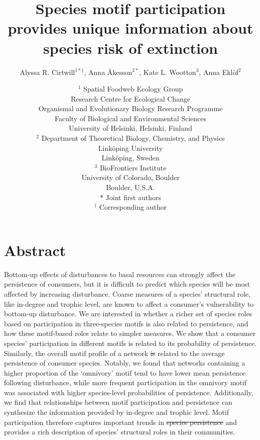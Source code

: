 \documentclass[12pt]{article}
\title{Species motif participation provides unique information about species risk of extinction}
\author{Alyssa R. Cirtwill{$^{1*\dagger}$, Anna \r{A}kesson$^{2*}$,  Kate L. Wootton$^{3}$, Anna Ekl\"{o}f{$^{2}$}}}
\date{\small$^1$ Spatial Foodweb Ecology Group\\
Research Centre for Ecological Change\\
Organismal and Evolutionary Biology Research Programme\\
Faculty of Biological and Environmental Sciences\\
University of Helsinki, Helsinki, Finland\\
\medskip
$^2$ Department of Theoretical Biology, Chemistry, and Physics\\ 
Link\"{o}ping University \\
Link\"{o}ping, Sweden\\
\medskip
\small $^3$ BioFrontiers Institute\\
University of Colorado, Boulder\\
Boulder, U.S.A. \\
\medskip
* Joint first authors\\
\medskip
$^\dagger$ Corresponding author}
\providecommand{\DIFadd}[1]{{\protect\color{blue}\uwave{#1}}} %
\providecommand{\DIFdel}[1]{{\protect\color{red}\sout{#1}}}                      %
\providecommand{\DIFaddbegin}{} %
\providecommand{\DIFaddend}{} %
\providecommand{\DIFdelbegin}{} %
\providecommand{\DIFdelend}{} %
\newcommand{\DIFscaledelfig}{0.5}
\newlength{\DIFdelgraphicswidth} %
\newlength{\DIFdelgraphicsheight} %
\newcommand{\DIFaddincludegraphics}[2][]{{\color{blue}\fbox{\DIFOincludegraphics[#1]{#2}}}} %
\newcommand{\DIFdelincludegraphics}[2][]{%
\sbox{\DIFdelgraphicsbox}{\DIFOincludegraphics[#1]{#2}}%
\settoboxwidth{\DIFdelgraphicswidth}{\DIFdelgraphicsbox} %
\settoboxtotalheight{\DIFdelgraphicsheight}{\DIFdelgraphicsbox} %
\scalebox{\DIFscaledelfig}{%
\parbox[b]{\DIFdelgraphicswidth}{\usebox{\DIFdelgraphicsbox}\\[-\baselineskip] \rule{\DIFdelgraphicswidth}{0em}}\llap{\resizebox{\DIFdelgraphicswidth}{\DIFdelgraphicsheight}{%
\setlength{\unitlength}{\DIFdelgraphicswidth}%
\begin{picture}(1,1)%
\thicklines\linethickness{2pt} %
{\color[rgb]{1,0,0}\put(0,0){\framebox(1,1){}}}%
{\color[rgb]{1,0,0}\put(0,0){\line( 1,1){1}}}%
{\color[rgb]{1,0,0}\put(0,1){\line(1,-1){1}}}%
\end{picture}%
}\hspace*{3pt}}} %
} %
\DeclareRobustCommand{\DIFaddbegin}{\DIFOaddbegin \let\includegraphics\DIFaddincludegraphics} %
\DeclareRobustCommand{\DIFaddend}{\DIFOaddend \let\includegraphics\DIFOincludegraphics} %
\DeclareRobustCommand{\DIFdelbegin}{\DIFOdelbegin \let\includegraphics\DIFdelincludegraphics} %
\DeclareRobustCommand{\DIFdelend}{\DIFOaddend \let\includegraphics\DIFOincludegraphics} %
\begin{document}
 
\maketitle 
\linenumbers
\raggedright

\setlength{\parindent}{15pt} 


\section*{Abstract}


    Bottom-up effects of disturbances to basal resources can strongly affect the persistence of consumers, but it is difficult to predict which species will be most affected by increasing disturbance.
    Coarse measures of a species' structural role, like in-degree and trophic level, are known to affect a consumer's vulnerability to bottom-up disturbance.
    We are interested in whether a richer set of species roles based on participation in three-species motifs is also related to persistence, and how these motif-based roles relate to simpler measures.
    We show that a consumer species' participation in different motifs is related to its probability of persistence. 
    Similarly, the overall motif profile of a network \DIFdelbegin \DIFdel{is }\DIFdelend \DIFaddbegin \DIFadd{was }\DIFaddend related to the average persistence of consumer species.
    Notably, we found that networks containing a higher proportion of the `omnivory' motif tend to have lower mean persistence following disturbance, while more frequent participation in the omnivory motif was associated with higher species-level probabilities of persistence.
    Additionally, we find that relationships between motif participation and persistence can synthesize the information provided by in-degree and trophic level.
    Motif participation therefore captures important trends in \DIFdelbegin \DIFdel{species persistence }\DIFdelend \DIFaddbegin \DIFadd{vulnerability to extinction }\DIFaddend and provides a rich description of species' structural roles in their communities.
\end{document}
